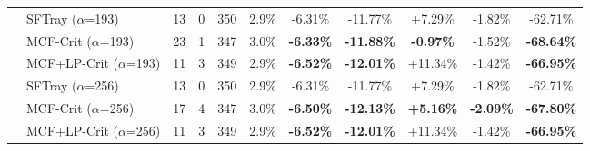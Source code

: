 \begin{table}[t]
{\begin{tabular}{ll|cccc|ccc|cc}
\addlinespace[0.5em]

 & SFTray ($\alpha$=193) & 13 & 0 & 350 & 2.9\% & -6.31\% & -11.77\% & +7.29\% & -1.82\% & -62.71\% \\

 & MCF-Crit ($\alpha$=193) & 23 & 1 & 347 & 3.0\% & \textbf{-6.33\%} & \textbf{-11.88\%} & \textbf{-0.97\%} & -1.52\% & \textbf{-68.64\%} \\

 & MCF+LP-Crit ($\alpha$=193) & 11 & 3 & 349 & 2.9\% & \textbf{-6.52\%} & \textbf{-12.01\%} & +11.34\% & -1.42\% & \textbf{-66.95\%} \\

\addlinespace[0.5em]

 & SFTray ($\alpha$=256) & 13 & 0 & 350 & 2.9\% & -6.31\% & -11.77\% & +7.29\% & -1.82\% & -62.71\% \\

 & MCF-Crit ($\alpha$=256) & 17 & 4 & 347 & 3.0\% & \textbf{-6.50\%} & \textbf{-12.13\%} & \textbf{+5.16\%} & \textbf{-2.09\%} & \textbf{-67.80\%} \\

 & MCF+LP-Crit ($\alpha$=256) & 11 & 3 & 349 & 2.9\% & \textbf{-6.52\%} & \textbf{-12.01\%} & +11.34\% & -1.42\% & \textbf{-66.95\%} \\

\midrule

\bottomrule

\end{tabular}

}

\end{table}


